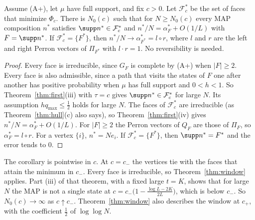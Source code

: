 \begin{corollary}\label{cor:map}
Assume \textup{(A+)}, let $\mu$ have full support, and fix $c>0$. Let
$\mathcal F^*_c$ be the set of faces that minimize $\Phi_c$. There is
$N_0(c)$ such that for $N\ge N_0(c)$ every MAP composition $n^*$ satisfies
$\supp n^*\in\mathcal F^*_c$ and $n^*/N=\alpha^*_F+O(1/L)$ with
$F=\supp n^*$. If $\mathcal F^*_c=\{F^*\}$, then
$n^*/N\to\alpha^*_{F^*}=l\circ r$, where $l$ and $r$ are the left and right
Perron vectors of $\Pi_{F^*}$ with $l\cdot r=1$. No reversibility is needed.
\end{corollary}

\begin{proof}
Every face is irreducible, since $G_F$ is complete by (A+) when
$\lvert F\rvert\ge2$. Every face is also admissible, since a path that
visits the states of $F$ one after another has positive probability when
$\mu$ has full support and $0<h<1$. So
Theorem~\ref{thm:first}(iii) with $\tau=c$ gives $\supp n^*\in\mathcal F^*_c$
for large $N$. Its assumption $hq_{\max}\le\frac12$ holds for large $N$. The
faces of $\mathcal F^*_c$ are irreducible (as Theorem~\ref{thm:hull}(c) also
says), so Theorem~\ref{thm:first}(iv) gives $n^*/N=\alpha^*_F+O(1/L)$. For
$\lvert F\rvert\ge2$ the Perron vectors of $Q_F$ are those of $\Pi_F$, so
$\alpha^*_F=l\circ r$. For a vertex $\{i\}$, $n^*=Ne_i$. If
$\mathcal F^*_c=\{F^*\}$, then $\supp n^*=F^*$ and the error tends to $0$.
\end{proof}

The corollary is pointwise in $c$. At $c=c_-$ the vertices tie with the faces
that attain the minimum in $c_-$. Every face is irreducible, so
Theorem~\ref{thm:window} applies. Part (iii) of that theorem, with a
fixed large $t=K$, shows that for large $N$ the MAP is not a single state at
$c=c_-\bigl(1-\frac{\log L-2K}{2L}\bigr)$, which is below $c_-$. So
$N_0(c)\to\infty$ as $c\uparrow c_-$. Theorem~\ref{thm:window} also describes
the window at $c_+$, with the coefficient $\frac12$ of $\log\log N$.

